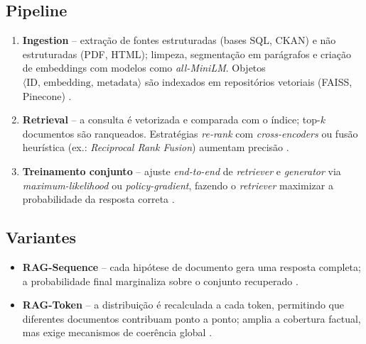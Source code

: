\subsection{Pipeline}
\label{sec:rag:pipeline}
\begin{enumerate}[label=\arabic*.]
  \item \textbf{Ingestion} – extração de fontes estruturadas (bases SQL, CKAN)
        e não estruturadas (PDF, HTML); limpeza, segmentação em parágrafos e
        criação de embeddings com modelos como \textit{all-MiniLM}.
        Objetos $\langle\text{ID},\,\text{embedding},\,\text{metadata}\rangle$
        são indexados em repositórios vetoriais (FAISS, Pinecone)
        \cite{qwak2024integrating,taipalus2024vector}.
  \item \textbf{Retrieval} – a consulta é vetorizada e comparada com o índice;
        top-$k$ documentos são ranqueados. Estratégias \emph{re-rank} com
        \textit{cross-encoders} ou fusão heurística (ex.: \textit{Reciprocal
        Rank Fusion}) aumentam precisão \cite{edwards2024hybrid}.
  \item \textbf{Treinamento conjunto} – ajuste \textit{end-to-end} de
        \textit{retriever} e \textit{generator} via
        \textit{maximum-likelihood} ou \textit{policy-gradient}, fazendo o
        \textit{retriever} maximizar a probabilidade da resposta correta
        \cite{zhang2025fine}.
\end{enumerate}

\subsection{Variantes}
\begin{itemize}
  \item \textbf{RAG-Sequence} – cada hipótese de documento gera uma resposta
        completa; a probabilidade final marginaliza sobre o conjunto recuperado
        \cite{lewis2020rag,edwards2024hybrid}.
  \item \textbf{RAG-Token} – a distribuição é recalculada a cada token,
        permitindo que diferentes documentos contribuam ponto a ponto; amplia a
        cobertura factual, mas exige mecanismos de coerência global
        \cite{zhang2025fine}.
\end{itemize}

